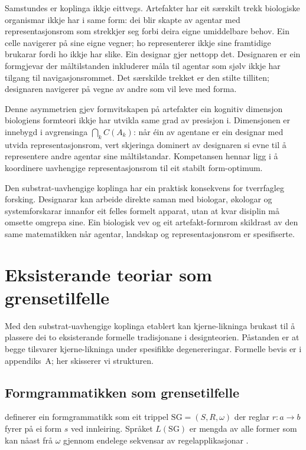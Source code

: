 \documentclass[10pt,a4paper,twocolumn]{article}
\begin{document}
Samstundes er koplinga ikkje eittvegs. Artefakter har eit særskilt trekk biologiske organismar ikkje har i same form: dei blir skapte av agentar med representasjonsrom som strekkjer seg forbi deira eigne umiddelbare behov. Ein celle navigerer på sine eigne vegner; ho representerer ikkje sine framtidige brukarar fordi ho ikkje har slike. Ein designar gjer nettopp det. Designaren er ein formgjevar der måltilstanden inkluderer måla til agentar som sjølv ikkje har tilgang til navigasjonsrommet. Det særskilde trekket er den stilte tilliten; designaren navigerer på vegne av andre som vil leve med forma.

Denne asymmetrien gjev formvitskapen på artefakter ein kognitiv dimensjon biologiens formteori ikkje har utvikla same grad av presisjon i. Dimensjonen er innebygd i avgrensinga $\bigcap_k C(A_k)$: når éin av agentane er ein designar med utvida representasjonsrom, vert skjeringa dominert av designaren si evne til å representere andre agentar sine måltilstandar. Kompetansen hennar ligg i å koordinere uavhengige representasjonsrom til eit stabilt form-optimum.

Den substrat-uavhengige koplinga har ein praktisk konsekvens for tverrfagleg forsking. Designarar kan arbeide direkte saman med biologar, økologar og systemforskarar innanfor eit felles formelt apparat, utan at kvar disiplin må omsette omgrepa sine. Ein biologisk vev og eit artefakt-formrom skildrast av den same matematikken når agentar, landskap og representasjonsrom er spesifiserte.

\section{Eksisterande teoriar som grensetilfelle}

Med den substrat-uavhengige koplinga etablert kan kjerne-likninga brukast til å plassere dei to eksisterande formelle tradisjonane i designteorien. Påstanden er at begge tilsvarer kjerne-likninga under spesifikke degenereringar. Formelle bevis er i appendiks~A; her skisserer vi strukturen.

\subsection{Formgrammatikken som grensetilfelle}

\citet{stinygips1972} definerer ein formgrammatikk som eit trippel $\mathrm{SG} = (S, R, \omega)$ der reglar $r: a \to b$ fyrer på ei form $s$ ved innleiring. Språket $L(\mathrm{SG})$ er mengda av alle former som kan nåast frå $\omega$ gjennom endelege sekvensar av regelapplikasjonar \citep{stiny2006}.
\end{document}
